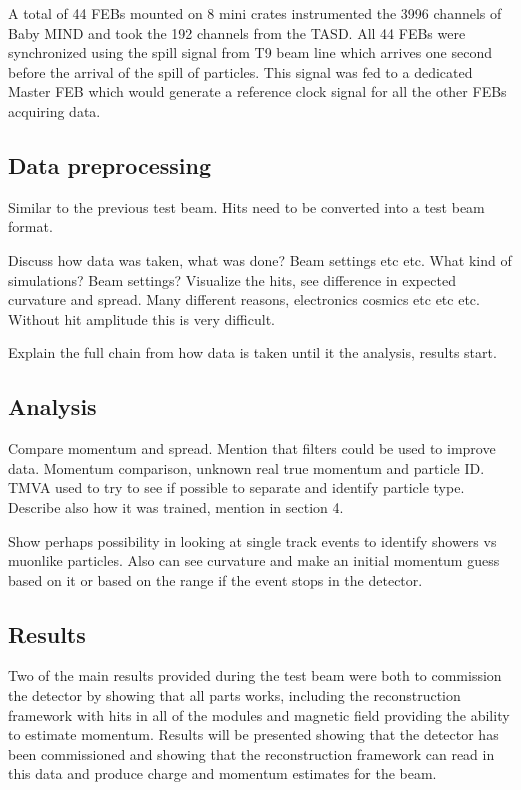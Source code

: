 A total of 44 FEBs mounted on 8 mini crates instrumented the 3996 channels of Baby MIND and took the 192 channels from the TASD. All 44 FEBs were synchronized using the spill signal from T9 beam line which arrives one second before the arrival of the spill of particles. This signal was fed to a dedicated Master FEB which would generate a reference clock signal for all the other FEBs acquiring data.

\subsection{Data preprocessing}
Similar to the previous test beam. Hits need to be converted into a test beam format.

Discuss how data was taken, what was done? Beam settings etc etc. What kind of simulations? Beam settings? Visualize the hits, see difference in expected curvature and spread. Many different reasons, electronics cosmics etc etc etc. Without hit amplitude this is very difficult.

Explain the full chain from how data is taken until it the analysis, results start.


\subsection{Analysis}

Compare momentum and spread. Mention that filters could be used to improve data. Momentum comparison, unknown real true momentum and particle ID. TMVA used to try to see if possible to separate and identify particle type. Describe also how it was trained, mention in section 4.

Show perhaps possibility in looking at single track events to identify showers vs muonlike particles. Also can see curvature and make an initial momentum guess based on it or based on the range if the event stops in the detector.


\subsection{Results}
Two of the main results provided during the test beam were both to commission the detector by showing that all parts works, including the reconstruction framework with hits in all of the modules and magnetic field providing the ability to estimate momentum. Results will be presented showing that the detector has been commissioned and showing that the reconstruction framework can read in this data and produce charge and momentum estimates for the beam.

